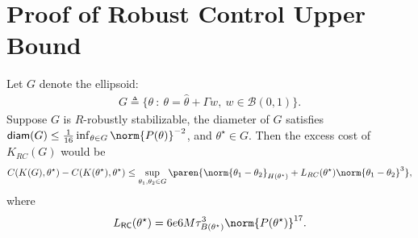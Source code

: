 \section{Proof of Robust Control Upper Bound}
\label{s: robust control proof}

\begin{lemma}
    \label{lem: Robust Control Upper Bound}
    Let $G$ denote the ellipsoid:
    \begin{align*}
        G \triangleq \{\theta ~:~ \theta=\hat \theta + \Gamma w, ~ w\in\mathcal{B}(0, 1)\}.
    \end{align*}
    Suppose $G$ is $R$-robustly stabilizable, the diameter of $G$ satisfies $\mathsf{diam}(G)\leq\frac{1}{16}\inf_{\theta\in G}\norm{P(\theta)}^{-2}$, and $\theta^\star\in G$. Then the excess cost of $K_{RC}(G)$ would be
    \begin{align*}
        C(K(G), \theta^\star) - C(K(\theta^\star), \theta^\star) \leq \sup_{\theta_1, \theta_2\in G}\paren{\norm{\theta_1-\theta_2}_{H(\theta^\star)} + L_{RC}(\theta^\star)\norm{\theta_1-\theta_2}^3}, 
    \end{align*}
    where
    \begin{align*}
        L_{\mathsf{RC}}(\theta^\star) = 6e6M\tau^3_{B(\theta^\star)}\norm{P(\theta^\star)}^{17}.
    \end{align*}
\end{lemma}


